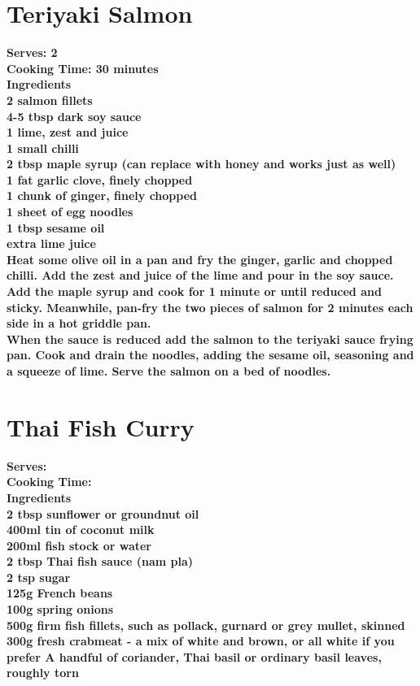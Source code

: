 \documentclass[18pt, oneside]{book}
\begin{document}
\section{Teriyaki Salmon}
\bf{Serves: 2} \\
\bf{Cooking Time: 30 minutes} \\

\bf{Ingredients} \normalfont \\
2 salmon fillets \\
4-5 tbsp dark soy sauce \\
1 lime, zest and juice \\
1 small chilli \\
2 tbsp maple syrup (can replace with honey and works just as well)\\
1 fat garlic clove, finely chopped \\
1 chunk of ginger, finely chopped \\
1 sheet of egg noodles \\
1 tbsp sesame oil \\
extra lime juice \\

Heat some olive oil in a pan and fry the ginger, garlic and chopped chilli. Add the zest and juice of the lime and pour in the soy sauce. Add the maple syrup and cook for 1 minute or until reduced and sticky. Meanwhile, pan-fry the two pieces of salmon for 2 minutes each side in a hot griddle pan. \\

When the sauce is reduced add the salmon to the teriyaki sauce frying pan. Cook and drain the noodles, adding the sesame oil, seasoning and a squeeze of lime. Serve the salmon on a bed of noodles.

\section{Thai Fish Curry}
\bf{Serves: } \\
\bf{Cooking Time: } \\

\bf{Ingredients} \normalfont \\
2 tbsp sunflower or groundnut oil \\
400ml tin of coconut milk \\
200ml fish stock or water \\
2 tbsp Thai fish sauce (nam pla) \\
2 tsp sugar \\
125g French beans \\
100g spring onions \\
500g firm fish fillets, such as pollack, gurnard or grey mullet, skinned \\
300g fresh crabmeat - a mix of white and brown, or all white if you prefer
A handful of coriander, Thai basil or ordinary basil leaves, roughly torn \\
\end{document}
